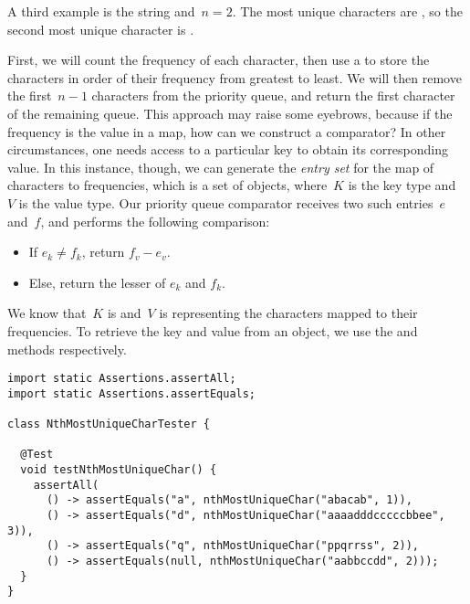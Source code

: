 A third example is the string  and~$n=2$. 
The most unique characters are , so the second most unique character is .

First, we will count the frequency of each character, then use a  to store the characters in order of their frequency from greatest to least. 
We will then remove the first~$n-1$ characters from the priority queue, and return the first character of the remaining queue. 
This approach may raise some eyebrows, because if the frequency is the value in a map, how can we construct a comparator? 
In other circumstances, one needs access to a particular key to obtain its corresponding value. 
In this instance, though, we can generate the \emph{entry set} for the map of characters to frequencies, which is a set of  objects, where~$K$ is the key type and~$V$ is the value type. 
Our priority queue comparator receives two such entries~$e$ and~$f$, and performs the following comparison:

\begin{itemize}
  \item If $e_k \neq f_k$, return $f_v - e_v$.
  \item Else, return the lesser of $e_k$ and $f_k$.
\end{itemize}

We know that~$K$ is  and~$V$ is  representing the characters mapped to their frequencies. 
To retrieve the key and value from an  object, we use the  and  methods respectively. 

\begin{lstlisting}[language=MyJava]
import static Assertions.assertAll;
import static Assertions.assertEquals;

class NthMostUniqueCharTester {

  @Test
  void testNthMostUniqueChar() {
    assertAll(
      () -> assertEquals("a", nthMostUniqueChar("abacab", 1)),
      () -> assertEquals("d", nthMostUniqueChar("aaaadddcccccbbee", 3)),
      () -> assertEquals("q", nthMostUniqueChar("ppqrrss", 2)),
      () -> assertEquals(null, nthMostUniqueChar("aabbccdd", 2)));
  }
}
\end{lstlisting}

